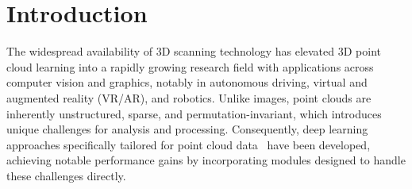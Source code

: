 \section{Introduction}
\label{sec:intro}




The widespread availability of 3D scanning technology has elevated 3D point cloud learning into a rapidly growing research field with applications across computer vision and graphics, notably in autonomous driving, virtual and augmented reality (VR/AR), and robotics. Unlike images, point clouds are inherently unstructured, sparse, and permutation-invariant, which introduces unique challenges for analysis and processing. Consequently, deep learning approaches specifically tailored for point cloud data~\cite{qi2017pointnet, li2018pointcnn, qian2022pointnext, qi2017pointnet++, wang2019dynamic, wu2024point} have been developed, achieving notable performance gains by incorporating modules designed to handle these challenges directly.

